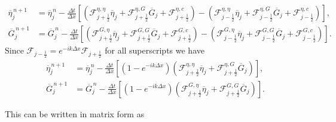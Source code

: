 \begin{align*}
\overline{\eta}_{j}^{\,n + 1} &=  \overline{\eta}^{\,n }_{j} - \frac{\Delta t}{\Delta x}  \left[ \left(\mathcal{F}_{j+\frac{1}{2}} ^{\eta,\eta} \overline{\eta}_j  + \mathcal{F}_{j+\frac{1}{2}} ^{\eta,G} \overline{G}_j + \mathcal{F}_{j+\frac{1}{2}} ^{\eta,c} \right) - \left(\mathcal{F}^{\eta,\eta}_{j-\frac{1}{2}}  \overline{\eta}_{j}  + \mathcal{F}^{\eta,G}_{j-\frac{1}{2}} \overline{G}_{j} + \mathcal{F}^{\eta,c}_{j-\frac{1}{2}} \right)  \right], \\
 \overline{G}^{\,n + 1}_{j} &= \overline{G}^{\,n }_{j} -\frac{\Delta t}{\Delta x}  \left[ \left(  \mathcal{F}_{j+\frac{1}{2}} ^{G,\eta} \overline{\eta}_{j}  + \mathcal{F}_{j+\frac{1}{2}} ^{G,G} \overline{G}_j + \mathcal{F}_{j+\frac{1}{2}} ^{G,c} \right) - \left(  \mathcal{F}_{j-\frac{1}{2}}^{G,\eta} \overline{\eta}_{j}  + \mathcal{F}^{G,G}_{j-\frac{1}{2}} \overline{G}_{j} + \mathcal{F}^{G,c}_{j-\frac{1}{2}} \right) \right].
\end{align*}
Since $\mathcal{F}_{j-\frac{1}{2}} = e^{-ik\Delta x} \mathcal{F}_{j+\frac{1}{2}}$ for all superscripts we have
\begin{align*}
\overline{\eta}_{j}^{\,n + 1} &=  \overline{\eta}^{\,n }_{j} - \frac{\Delta t}{\Delta x}  \left[ \left(1 - e^{-ik\Delta x}\right) \left(\mathcal{F}_{j+\frac{1}{2}}^{\eta,\eta} \overline{\eta}_j  + \mathcal{F}_{j+\frac{1}{2}}^{\eta,G} \overline{G}_j \right) \right], \\
\overline{G}^{\,n + 1}_{j} &= \overline{G}^{\,n }_{j} -\frac{\Delta t}{\Delta x}  \left[ \left(1 - e^{-ik\Delta x}\right)\left(  \mathcal{F}_{j+\frac{1}{2}}^{G,\eta} \overline{\eta}_{j}  + \mathcal{F}_{j+\frac{1}{2}}^{G,G} \overline{G}_j \right) \right].
\end{align*}


This can be written in matrix form as

